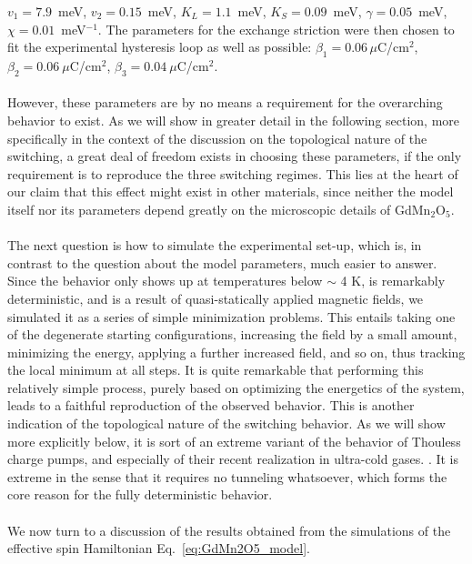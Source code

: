 $v_1 = 7.9$~meV, $v_2 = 0.15$~meV, $K_L = 1.1$~meV, $K_S = 0.09$~meV, $\gamma = 0.05$~meV, $\chi=0.01$~meV$^{-1}$.
The parameters for the exchange striction were then chosen to fit the experimental hysteresis loop as well as possible:
${\beta_1 = 0.06\,\mu}$C/cm$^2$, $\beta_2 = 0.06\:\mu$C/cm$^2$, $\beta_3 = 0.04\:\mu$C/cm$^2$.
\\\\
However, these parameters are by no means a requirement for the overarching behavior to exist. As we will show in greater detail in the following section, more specifically in the context of the discussion on the topological nature of the switching, a great deal of freedom exists in choosing these parameters, if the only requirement is to reproduce the three switching regimes.
This lies at the heart of our claim that this effect might exist in other materials, since neither the model itself nor its parameters depend greatly on the microscopic details of GdMn$_2$O$_5$. 
\\\\
The next question is how to simulate the experimental set-up, which is, in contrast to the question about the model parameters, much easier to answer.
Since the behavior only shows up at temperatures below $\sim$ 4 K, is remarkably deterministic, and is a result of quasi-statically applied magnetic fields, we simulated it as a series of simple minimization problems.
This entails taking one of the degenerate starting configurations, increasing the field by a small amount, minimizing the energy, applying a further increased field, and so on, thus tracking the local minimum at all steps.
It is quite remarkable that performing this relatively simple process, purely based on optimizing the energetics of the system, leads to a faithful reproduction of the observed behavior.
This is another indication of the topological nature of the switching behavior.
As we will show more explicitly below, it is sort of an extreme variant of the behavior of Thouless charge pumps, and especially of their recent realization in ultra-cold gases. \cite{Rice82,Thouless1982,Thouless83,Lohse16,Nakajima16, Atala13}.
It is extreme in the sense that it requires no tunneling whatsoever, which forms the core reason for the fully deterministic behavior.
\\\\

We now turn to a discussion of the results obtained from the simulations of the effective spin Hamiltonian Eq.~\eqref{eq:GdMn2O5_model}.

